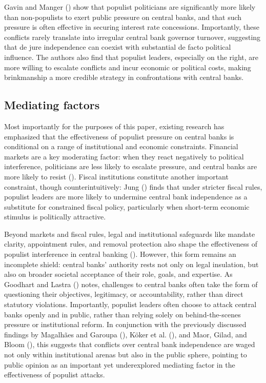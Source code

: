 \documentclass[
  11pt,
  letterpaper,
  DIV=11,
  numbers=noendperiod]{scrartcl}
\begin{document}
Gavin and Manger () show that populist
politicians are significantly more likely than non-populists to exert
public pressure on central banks, and that such pressure is often
effective in securing interest rate concessions. Importantly, these
conflicts rarely translate into irregular central bank governor
turnover, suggesting that de jure independence can coexist with
substantial de facto political influence. The authors also find that
populist leaders, especially on the right, are more willing to escalate
conflicts and incur economic or political costs, making brinkmanship a
more credible strategy in confrontations with central banks.

\subsection{Mediating factors}\label{mediating-factors}

Most importantly for the purposes of this paper, existing research has
emphasized that the effectiveness of populist pressure on central banks
is conditional on a range of institutional and economic constraints.
Financial markets are a key moderating factor: when they react
negatively to political interference, politicians are less likely to
escalate pressure, and central banks are more likely to resist
(). Fiscal institutions
constitute another important constraint, though counterintuitively: Jung
() finds that under stricter fiscal rules,
populist leaders are more likely to undermine central bank independence
as a substitute for constrained fiscal policy, particularly when
short-term economic stimulus is politically attractive.

Beyond markets and fiscal rules, legal and institutional safeguards like
mandate clarity, appointment rules, and removal protection also shape
the effectiveness of populist interference in central banking
(). However, this
form remains an incomplete shield: central banks' authority rests not
only on legal insulation, but also on broader societal acceptance of
their role, goals, and expertise. As Goodhart and Lastra
() notes, challenges to central banks
often take the form of questioning their objectives, legitimacy, or
accountability, rather than direct statutory violations. Importantly,
populist leaders often choose to attack central banks openly and in
public, rather than relying solely on behind-the-scenes pressure or
institutional reform. In conjunction with the previously discussed
findings by Magalhães and Garoupa
(), Köker et al.
(), and Maor, Gilad, and Bloom
(), this suggests that conflicts over
central bank independence are waged not only within institutional arenas
but also in the public sphere, pointing to public opinion as an
important yet underexplored mediating factor in the effectiveness of
populist attacks.
\end{document}
